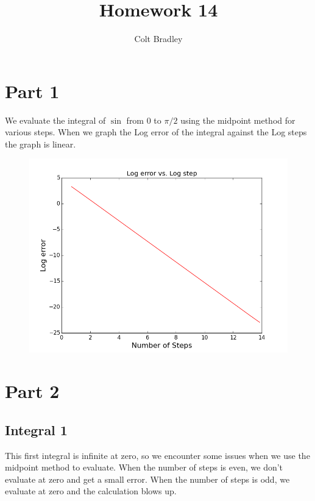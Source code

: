 \documentclass[11pt]{article}
\begin{document}
\title{Homework 14}
\author{Colt Bradley}
\date{}
\maketitle

\section{Part 1}

We evaluate the integral of $\sin$ from $0$ to $\pi /2$ using the midpoint method for various steps. When we graph the Log error of the integral against the Log steps the graph is linear. 

\begin{figure}[ht]
\centering
\includegraphics[scale=.5]{logerror.png}
\end{figure}

\section{Part 2}

\subsection{Integral 1}

This first integral is infinite at zero, so we encounter some issues when we use the midpoint method to evaluate. When the number of steps is even, we don't evaluate at zero and get a small error. When the number of steps is odd, we evaluate at zero and the calculation blows up. 
\end{document}
